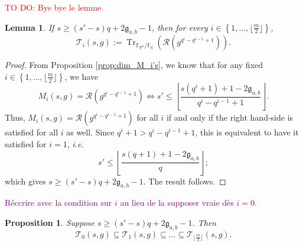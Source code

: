 \documentclass[a4paper]{article}
\newtheorem{proposition}[thm]{Proposition}
\newtheorem{lemma}[thm]{Lemma}
\theoremstyle{definition}
\theoremstyle{remark}
\newcommand{\calR}{\mathcal{R}}
\newcommand{\calT}{\mathcal{T}}
\newcommand{\fq}{\mathbb{F}_{q}}
\newcommand{\Tr}[1]{\operatorname{Tr}_{\mathbb{F}_{q^m}/\fq}\left(#1\right)}
\newcommand{\set}[1]{\left\{#1\right\}}
\newcommand\jade[1]{\textcolor{purple}{#1}}
\newcommand\TODO[1]{\textcolor{red}{TO DO: #1}}
\begin{document}
\TODO{Bye bye le lemme.}

\begin{lemma} \label{lem:cond_inclusion_T_i's}
    If $s \geq (s'-s)q+2\mathfrak{g}_{a,b}-1$, then for every $i \in \set{1,\dots,\lfloor \frac{m}{2} \rfloor}$,
    $$\calT_i(s,g) := \Tr{\calR(g^{q^i-q^{i-1}+1})}.$$
\end{lemma}

\begin{proof}
    From Proposition \ref{prop:dim_M_i's}, we know that for any fixed $i \in \set{1,\dots,\lfloor \frac{m}{2} \rfloor}$, we have 
    $$M_i(s,g) = \calR(g^{q^i-q^{i-1}+1}) \iff  s' \leq \left\lfloor \dfrac{s(q^i+1)+1-2\mathfrak{g}_{a,b}}{q^i-q^{i-1}+1}\right\rfloor.$$
    Thus, $M_i(s,g) = \calR(g^{q^i-q^{i-1}+1})$ for all $i$ if and only if the right hand-side is satisfied for all $i$ as well. Since $q^i+1 > q^i-q^{i-1}+1$, this is equivalent to have it satisfied for $i=1$, \emph{i.e.}
    $$s' \leq \left\lfloor \dfrac{s(q+1)+1-2\mathfrak{g}_{a,b}}{q}\right\rfloor;$$
    which gives $s \geq (s'-s)q+2\mathfrak{g}_{a,b}-1$. The result follows.
\end{proof}

\jade{Réccrire avec la condition sur $i$ au lieu de la supposer vraie dès $i=0$.}

\begin{proposition} \label{prop:inclusion_T_i's} Suppose $s \geq (s'-s)q+2\mathfrak{g}_{a,b}-1$. Then
    $$\calT_0(s,g) \subseteq \calT_1(s,g) \subseteq \dots \subseteq \calT_{\lfloor \frac{m}{2}\rfloor}(s,g).$$
\end{proposition}
\end{document}
